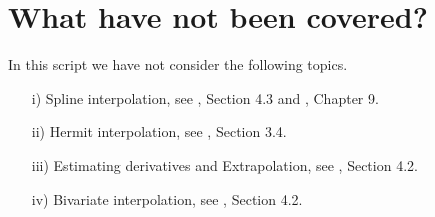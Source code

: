 \documentclass[12pt]{article}
\theoremstyle{theorem}
\begin{document}
\section{What have not been covered?}

\begin{shaded}
In this script we have not consider the following topics.
\begin{enumerate}
 \item[i)] Spline interpolation, see \cite{AtkH03}, Section 4.3 and \cite{CheK07}, Chapter 9. 
 \item[ii)] Hermit interpolation, see \cite{BurF10}, Section 3.4. 
 \item[iii)] Estimating derivatives and Extrapolation, see \cite{CheK07}, Section 4.2.
 \item[iv)] Bivariate interpolation, see \cite{CheK07}, Section 4.2.
\end{enumerate}
\end{shaded}

\newpage

\nocite{*}

 
\end{document}
